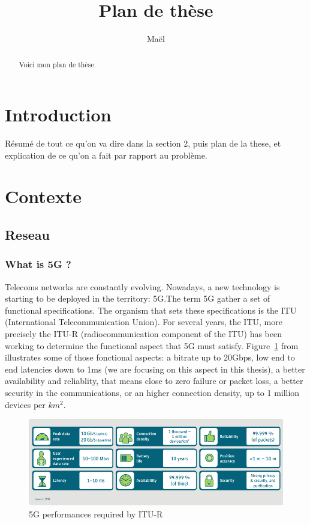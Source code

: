 \documentclass[a4paper,10pt]{article}
\title{Plan de thèse}
\author{Maël}
\begin{document}
 
\maketitle

\begin{abstract}
Voici mon plan de thèse.
\end{abstract}
\section{Introduction}
Résumé  de tout ce qu'on va dire dans la section 2, puis plan de la these, et explication de ce qu'on a fait par rapport au problème.

\section{Contexte}

\subsection{Reseau}

\subsubsection{What is 5G ?}
Telecoms networks are constantly evolving. Nowadays, a new technology is starting to be deployed in the territory: 5G.The term 5G gather a set of functional specifications. The organism that sets these specifications is the ITU (International Telecommunication Union). For several years, the ITU, more precisely the ITU-R (radiocommunication component of the ITU) has been working to determine the functional aspect that 5G must satisfy. Figure~\ref{fig:5gperf} from~\cite{5GACIA} illustrates some of those fonctional aspects: a bitrate up to 20Gbps, low end to end latencies down to 1ms (we are focusing on this aspect in this thesis), a better availability and reliablity, that means close to zero failure or packet loss, a better security in the communications, or an higher connection density, up to 1 million devices per $km^2$.

  \begin{figure}[h]
      \begin{center}
      \includegraphics[width=1\textwidth]{performance5g.png}
      \end{center}
      \caption{5G performances required by ITU-R}\label{fig:5gperf}
      \end{figure}
\end{document}
